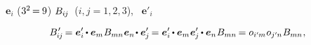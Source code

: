 

\label{para:tensoranditscomponents}


~${\bm{e}_i}$   (${3^2 \hspace{-0.24ex}=\hspace{-0.12ex} 9}$)  ${B_{i\hspace{-0.1ex}j}}$~(${i, j = 1, 2, 3}$),
  ~${\bm{e}'_i}$ 

\nopagebreak\vspace{-0.25em}\begin{equation}\label{orthotransform:2}
B\hspace{.16ex}'_{\hspace{-0.33ex}i\hspace{-0.1ex}j} \hspace{-0.2ex}
= \bm{e}'_i \hspace{-0.15ex} \dotp \bm{e}_m \hspace{.1ex} B_{mn} \hspace{.1ex} \bm{e}_n \hspace{-0.3ex} \dotp \bm{e}'_{\hspace{-0.1ex}j} \hspace{-0.2ex}
= \bm{e}'_i \hspace{-0.15ex} \dotp \bm{e}_m \hspace{.1ex} \bm{e}'_{\hspace{-0.1ex}j} \hspace{-0.15ex} \dotp \bm{e}_n \hspace{.1ex} B_{mn} \hspace{-0.2ex}
= \cosinematrix{i'\hspace{-0.1ex}m} \hspace{.1ex} \cosinematrix{j'\hspace{-0.1ex}n} \hspace{.1ex} B_{mn}
\hspace{.1ex} ,
\end{equation}

